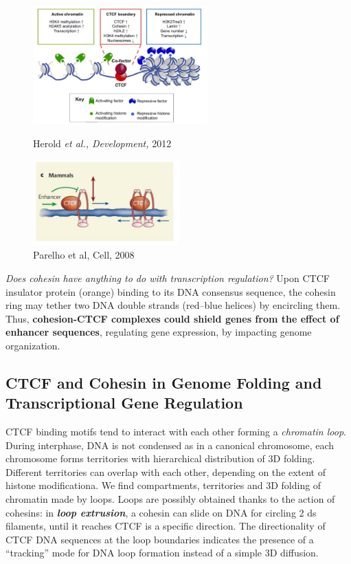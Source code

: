 \begin{figure}[!htb]
   \begin{minipage}{0.48\textwidth}
     \centering
     \includegraphics[width=0.6\textwidth]{../_resources/Screenshot_2022-10-14_at_12-11-11.png}
\caption{Herold \emph{et al., Development,} 2012}
\label{fig:chrom}
   \end{minipage}\hfill
   \begin{minipage}{0.48\textwidth}
     \centering
     \includegraphics[width=0.5\textwidth]{../_resources/Screenshot_2022-10-14_at_12-10-46.png}
\caption{Parelho et al, Cell, 2008}
\label{fig:cohe}
   \end{minipage}
\end{figure}

\emph{Does cohesin have anything to do with transcription regulation?}
Upon CTCF insulator protein (orange) binding to its DNA consensus sequence, the cohesin ring may tether two DNA double strands (red--blue helices) by encircling them. Thus, \textbf{cohesion-CTCF complexes could shield genes from the effect of enhancer sequences}, regulating gene expression, by impacting genome organization.

\subsection{CTCF and Cohesin in Genome Folding and Transcriptional Gene Regulation}

CTCF binding motifs tend to interact with each other forming a \emph{chromatin loop}. During interphase, DNA is not condensed as in a canonical chromosome, each chromosome forms territories with hierarchical distribution of 3D folding. Different territories can overlap with each other, depending on the extent of histone modificationa. We find compartments, territories and 3D folding of chromatin made by loops. Loops are possibly obtained thanks to the action of cohesins: in \textbf{\emph{loop extrusion}}, a cohesin can slide on DNA for circling 2 ds filaments, until it reaches CTCF is a specific direction. The directionality of CTCF DNA sequences at the loop boundaries indicates the presence of a ``tracking'' mode for DNA loop formation instead of a simple 3D diffusion.

